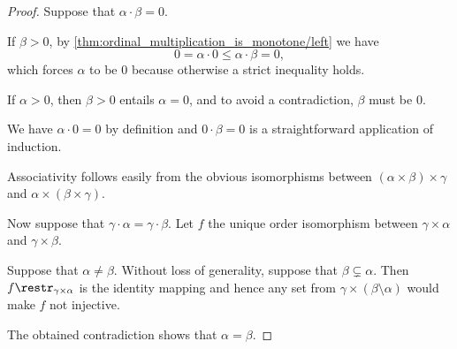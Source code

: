 \begin{proof}
   Suppose that \( \alpha \cdot \beta = 0 \).

  If \( \beta > 0 \), by \cref{thm:ordinal_multiplication_is_monotone/left} we have
  \begin{equation*}
    0 = \alpha \cdot 0 \leq \alpha \cdot \beta = 0,
  \end{equation*}
  which forces \( \alpha \) to be \( 0 \) because otherwise a strict inequality holds.

  If \( \alpha > 0 \), then \( \beta > 0 \) entails \( \alpha = 0 \), and to avoid a contradiction, \( \beta \) must be \( 0 \).

   We have \( \alpha \cdot 0 = 0 \) by definition and \( 0 \cdot \beta = 0 \) is a straightforward application of induction.

   Associativity follows easily from the obvious isomorphisms between \( (\alpha \times \beta) \times \gamma \) and \( \alpha \times (\beta \times \gamma) \).

   Now suppose that \( \gamma \cdot \alpha = \gamma \cdot \beta \). Let \( f \) the unique order isomorphism between \( \gamma \times \alpha \) and \( \gamma \times \beta \).

  Suppose that \( \alpha \neq \beta \). Without loss of generality, suppose that \( \beta \subsetneq \alpha \). Then \( f\restr_{\gamma \times \alpha} \) is the identity mapping and hence any set from \( \gamma \times (\beta \setminus \alpha) \) would make \( f \) not injective.

  The obtained contradiction shows that \( \alpha = \beta \).
\end{proof}


